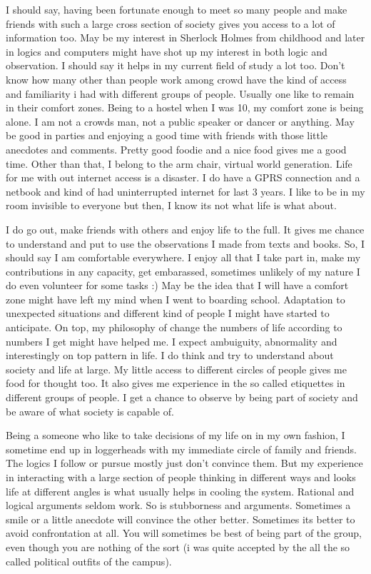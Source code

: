I should say, having been fortunate enough to meet so many people and make friends with such a 
large cross section of society gives you access to a lot of information too. May be my interest
in Sherlock Holmes from childhood and later in logics and computers might have shot up my interest 
in both logic and observation. I should say it helps in my current field of study a lot too. Don't 
know how many other than people work among crowd have the kind of access and familiarity i had with
different groups of people. Usually one like to remain in their comfort zones. Being to a hostel 
when I was 10, my comfort zone is being alone. I am not a crowds man, not a public speaker or dancer 
or anything. May be good in parties and enjoying a good time with friends with those little anecdotes
and comments. Pretty good foodie and a nice food gives me a good time. Other than that, I belong to 
the arm chair, virtual world generation. Life for me with out internet access is a disaster. I do have
a GPRS connection and a netbook and kind of had uninterrupted internet for last 3 years. I like to 
be in my room invisible to everyone but then, I know its not what life is what about. 

I do go out, make friends with others and enjoy life to the full. It gives me chance to understand 
and put to use the observations I made from texts and books. So, I should say I am comfortable
everywhere. I enjoy all that I take part in, make my contributions in any capacity, get embarassed,
sometimes unlikely of my nature I do even volunteer for some tasks :) May be the idea that I will 
have a comfort zone might have left my mind when I went to boarding school. Adaptation to 
unexpected situations and different kind of people I might have started to anticipate. On top, 
my philosophy of change the numbers of life according to numbers I get might have helped me. I 
expect ambuiguity, abnormality and interestingly on top pattern in life. I do think and try to
understand about society and life at large. My little access to different circles of people gives 
me food for thought too. It also gives me experience in the so called etiquettes in different 
groups of people. I get a chance to observe by being part of society and be aware of what society 
is capable of. 

Being a someone who like to take decisions of my life on in my own fashion, I sometime end up in
loggerheads with my immediate circle of family and friends. The logics I follow or pursue mostly 
just don't convince them. But my experience in interacting with a large section of people thinking 
in different ways and looks life at different angles is what usually helps in cooling the system.
Rational and logical arguments seldom work. So is stubborness and arguments. Sometimes a smile or 
a little anecdote will convince the other better. Sometimes its better to avoid confrontation at 
all. You will sometimes be best of being part of the group, even though you are nothing of the 
sort (i was quite accepted by the all the so called political outfits of the campus). 

